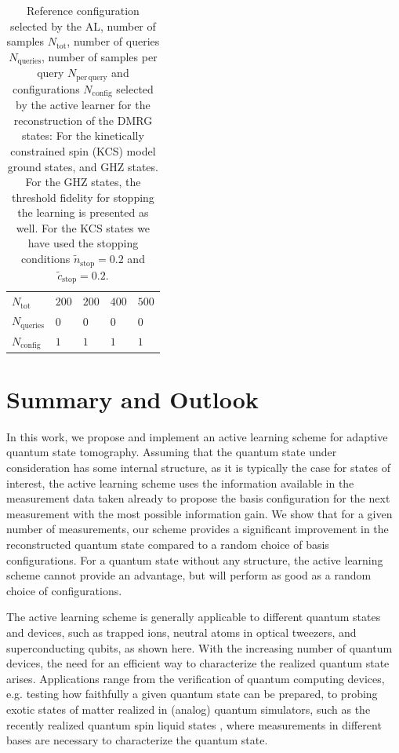 \documentclass[pra,aps,showpacs,groupedaddress,superscriptaddress,twocolumn,toc=flat,biblatex,footinbib]{revtex4-1}
\begin{document}
\begin{table}[]
\begin{tabular}{p{1.91 cm}|p{1.3 cm}p{1.3 cm}p{1.3 cm}p{1.3 cm}}
$N_{\mathrm{tot}}$         &    $200$      &       $200$   &  $400$        &    $500$       \\
$N_{\mathrm{queries}}$  & $0$         &    $0$      & $0$  &  $0$   \\  
$N_{\mathrm{config}}$  & $1$         &    $1$      & $1$         &  $1$         
\end{tabular}
\caption{Reference configuration selected by the AL, number of samples $N_{\mathrm{tot}}$, number of queries $N_{\mathrm{queries}}$, number of samples per query $N_{\mathrm{per\,query}}$ and configurations $N_{\mathrm{config}}$ selected by the active learner for the reconstruction of the DMRG states: For the kinetically constrained spin (KCS) model ground states, and GHZ states. For the GHZ states, the threshold fidelity for stopping the learning is presented as well. For the KCS states we have used the stopping conditions $ \tilde{n}_{\mathrm{stop}}=0.2$ and $ \tilde{c}_{\mathrm{stop}}=0.2$.}
\label{tab:Samples_DMRG}
\end{table}








\section{Summary and Outlook \label{sec:Summary}}

In this work, we propose and implement an active learning scheme for adaptive quantum state tomography.
Assuming that the quantum state under consideration has some internal structure, as it is typically the case for states of interest, the active learning scheme uses the information available in the measurement data taken already to propose the basis configuration for the next measurement with the most possible information gain.
We show that for a given number of measurements, our scheme provides a significant improvement in the reconstructed quantum state compared to a random choice of basis configurations. For a quantum state without any structure, the active learning scheme cannot provide an advantage, but will perform as good as a random choice of configurations. 

The active learning scheme is generally applicable to different quantum states and devices, such as trapped ions, neutral atoms in optical tweezers, and superconducting qubits, as shown here. With the increasing number of quantum devices, the need for an efficient way to characterize the realized quantum state arises. Applications range from the verification of quantum computing devices, e.g. testing how faithfully a given quantum state can be prepared, to probing exotic states of matter realized in (analog) quantum simulators, such as the recently realized quantum spin liquid states \cite{Semeghini2021,Satzinger2021}, where measurements in different bases are necessary to characterize the quantum state. 
\end{document}
